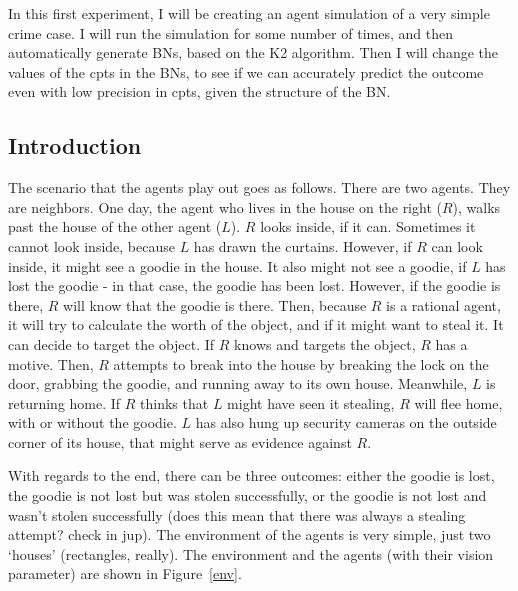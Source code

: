 In this first experiment, I will be creating an agent simulation of a very simple crime case. I will run the simulation for some number of times, and then automatically generate BNs, based on the K2 algorithm. Then I will change the values of the cpts in the BNs, to see if we can accurately predict the outcome even with low precision in cpts, given the structure of the BN.

\subsection{Introduction}

The scenario that the agents play out goes as follows. There are two agents. They are neighbors. One day, the agent who lives in the house on the right ($R$), walks past the house of the other agent ($L$). $R$ looks inside, if it can. Sometimes it cannot look inside, because $L$ has drawn the curtains. However, if $R$ can look inside, it might see a goodie in the house. It also might not see a goodie, if $L$ has lost the goodie - in that case, the goodie has been lost. However, if the goodie is there, $R$ will know that the goodie is there. Then, because $R$ is a rational agent, it will try to calculate the worth of the object, and if it might want to steal it. It can decide to target the object. If $R$ knows and targets the object, $R$ has a motive. Then, $R$ attempts to break into the house by breaking the lock on the door, grabbing the goodie, and running away to its own house.  Meanwhile, $L$ is returning home. If $R$ thinks that $L$ might have seen it stealing, $R$ will flee home, with or without the goodie. $L$ has also hung up security cameras on the outside corner of its house, that might serve as evidence against $R$.

With regards to the end, there can be three outcomes: either the goodie is lost, the goodie is not lost but was stolen successfully, or the goodie is not lost and wasn't stolen successfully ({\color{red}does this mean that there was always a stealing attempt? check in jup}). The environment of the agents is very simple, just two `houses' (rectangles, really). The environment and the agents (with their vision parameter) are shown in Figure~\ref{env}.


